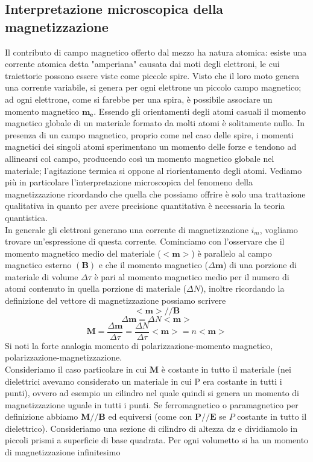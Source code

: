 \documentclass[
10pt, %
a4paper, %
oneside, %
headinclude,footinclude, %
BCOR5mm, %
]{scrartcl}
\begin{document}
\subsection{Interpretazione microscopica della magnetizzazione}
Il contributo di campo magnetico offerto dal mezzo ha natura atomica: esiste una corrente atomica detta "amperiana" causata dai moti degli elettroni, le cui traiettorie possono essere viste come piccole spire. Visto che il loro moto genera una corrente variabile, si genera per ogni elettrone un piccolo campo magnetico; ad ogni elettrone, come si farebbe per una spira, è possibile associare un momento magnetico \(\mathbf{m_e}\). Essendo gli orientamenti degli atomi casuali il momento magnetico globale di un materiale formato da molti atomi è solitamente nullo. In presenza di un campo magnetico, proprio come nel caso delle spire, i momenti magnetici dei singoli atomi sperimentano un momento delle forze e tendono ad allinearsi col campo, producendo così un momento magnetico globale nel materiale; l'agitazione termica si oppone al riorientamento degli atomi. Vediamo più in particolare l'interpretazione microscopica del fenomeno della magnetizzazione ricordando che quella che possiamo offrire è solo una trattazione qualitativa in quanto per avere precisione quantitativa è necessaria la teoria quantistica.\\
In generale gli elettroni generano una corrente di magnetizzazione \(i_m\), vogliamo trovare un'espressione di questa corrente. Cominciamo con l'osservare che il momento magnetico  medio del materiale (\(<\mathbf{m}>\)) è parallelo al campo magnetico esterno \((\mathbf{B})\) e che il momento magnetico (\(\Delta\mathbf{m}\)) di una porzione di materiale di volume \(\Delta \tau\) è pari al momento magnetico medio per il numero di atomi contenuto in quella porzione di materiale (\(\Delta N\)), inoltre ricordando la definizione del vettore di magnetizzazione possiamo scrivere
\[<\mathbf{m}>//\mathbf{B}\]
\[\Delta \mathbf{m}=\Delta N<\mathbf{m>}\]
\[\mathbf{M}=\frac{\Delta \mathbf{m}}{\Delta \tau}=\frac{\Delta N }{\Delta \tau}<\mathbf{m}>=n<\mathbf{m}>\]
Si noti la forte analogia momento di polarizzazione-momento magnetico, polarizzazione-magnetizzazione.\\
Consideriamo il caso particolare in cui \(\mathbf{M}\) è costante in tutto il materiale (nei dielettrici avevamo considerato un materiale in cui P era costante in tutti i punti), ovvero ad esempio un cilindro nel quale quindi si genera un momento di magnetizzazione uguale in tutti i punti. Se ferromagnetico o paramagnetico per definizione abbiamo \(\mathbf{M}//\mathbf{B}\) ed equiversi (come con \(\mathbf{P}//\mathbf{E}\) se \(P\) costante in tutto il dielettrico). Consideriamo una sezione di cilindro di altezza dz e dividiamolo in piccoli prismi a superficie di base quadrata. Per ogni volumetto si ha un momento di magnetizzazione infinitesimo
\end{document}
